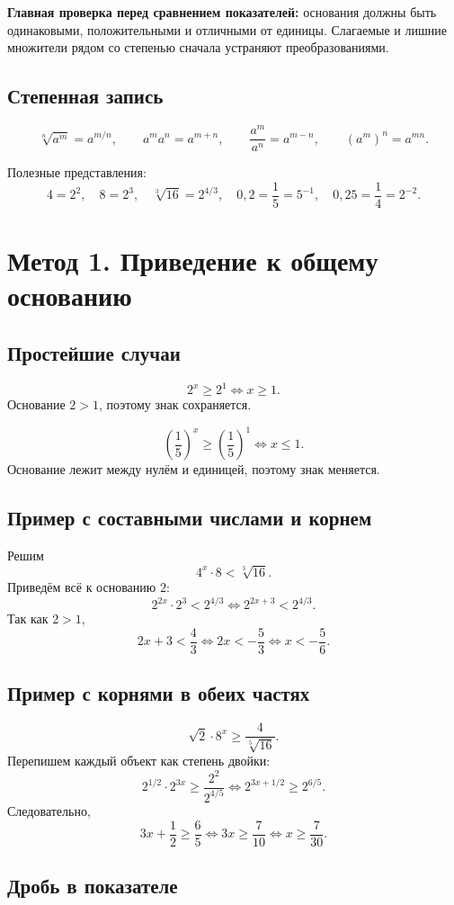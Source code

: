 \documentclass[a4paper,12pt]{article}
\newcommand{\key}[1]{\textcolor{accent}{\textbf{#1}}}
\begin{document}
\key{Главная проверка перед сравнением показателей:} основания должны быть одинаковыми, положительными и отличными от единицы. Слагаемые и лишние множители рядом со степенью сначала устраняют пре\-об\-ра\-зо\-ва\-ни\-я\-ми.

\subsection{Степенная запись}

\[
\sqrt[n]{a^m}=a^{m/n},\qquad
a^m a^n=a^{m+n},\qquad
\frac{a^m}{a^n}=a^{m-n},\qquad
(a^m)^n=a^{mn}.
\]

Полезные представления:
\[
4=2^2,\quad 8=2^3,\quad \sqrt[3]{16}=2^{4/3},
\quad 0{,}2=\frac15=5^{-1},\quad 0{,}25=\frac14=2^{-2}.
\]

\section{Метод 1. Приведение к общему основанию}

\subsection{Простейшие случаи}

\[
2^x\ge2^1\iff x\ge1.
\]
Основание $2>1$, поэтому знак сохраняется.

\[
\left(\frac15\right)^x\ge\left(\frac15\right)^1\iff x\le1.
\]
Основание лежит между нулём и единицей, поэтому знак меняется.

\subsection{Пример с составными числами и корнем}

Решим
\[
4^x\cdot8<\sqrt[3]{16}.
\]
Приведём всё к основанию $2$:
\[
2^{2x}\cdot2^3<2^{4/3}
\iff
2^{2x+3}<2^{4/3}.
\]
Так как $2>1$,
\[
2x+3<\frac43
\iff 2x<-\frac53
\iff x<-\frac56.
\]

\subsection{Пример с корнями в обеих частях}

\[
\sqrt2\cdot8^x\ge\frac4{\sqrt[5]{16}}.
\]
Перепишем каждый объект как степень двойки:
\[
2^{1/2}\cdot2^{3x}\ge\frac{2^2}{2^{4/5}}
\iff
2^{3x+1/2}\ge2^{6/5}.
\]
Следовательно,
\[
3x+\frac12\ge\frac65
\iff 3x\ge\frac7{10}
\iff x\ge\frac7{30}.
\]

\subsection{Дробь в показателе}
\end{document}
